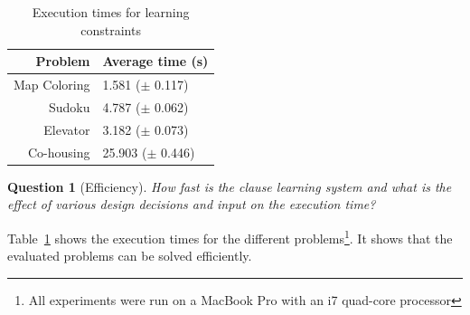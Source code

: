 \documentclass[letterpaper]{article}
\newtheorem{question}{Question}
\theoremstyle{definition}
\begin{document}
\begin{table}
  \caption{Execution times for learning constraints}
  \begin{tabularx}{\linewidth}{r|X}

\textbf{Problem}    & \textbf{Average time (s)} \\ %
\toprule
Map Coloring        & 1.581   ($\pm$ 0.117)     \\ %
Sudoku              & 4.787   ($\pm$ 0.062)     \\ %
Elevator            & 3.182   ($\pm$ 0.073)     \\ %
Co-housing          & 25.903  ($\pm$ 0.446)      %
  \end{tabularx}
  \label{tbl:uitvoering}
\end{table}

\begin{question}[Efficiency]
  How fast is the clause learning system and what is the effect of various design decisions and input on the execution time?
\end{question}

Table~\ref{tbl:uitvoering} shows the execution times for the different problems\footnote{All experiments were run on a MacBook Pro with an i7 quad-core processor}.
It shows that the evaluated problems can be solved efficiently.
\end{document}
